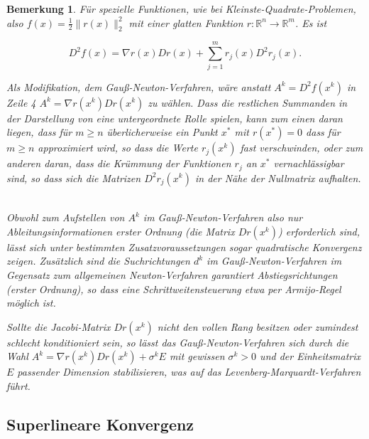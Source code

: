 \documentclass[11pt]{scrreprt}
\theoremstyle{thmstyle}
\numberwithin{thm}{section}
\newtheorem*{bemerkung*}{Bemerkung}
\begin{document}
\begin{bemerkung*}
	Für spezielle Funktionen, wie bei Kleinste-Quadrate-Problemen, also $f(x) = \frac{1}{2} \| r(x) \|_2^2$ mit einer glatten Funktion $r \colon \mathbb{R}^n \rightarrow \mathbb{R}^m$. Es ist
	
	$$ D^2 f(x) = \nabla r(x) D r(x) + \sum_{j=1}^m r_j(x) D^2 r_j(x). $$
	
	Als Modifikation, dem Gauß-Newton-Verfahren, wäre anstatt $A^k = D^2 f (x^k)$ in Zeile 4 $A^k = \nabla r(x^k) Dr(x^k)$ zu wählen. Dass die restlichen Summanden in der Darstellung von eine untergeordnete Rolle spielen, kann zum einen daran liegen, dass für $m \geq n$ überlicherweise ein Punkt $x^*$ mit $r(x^*) = 0$ dass für $m \geq n$ approximiert wird, so dass die Werte $r_j (x^k)$ fast verschwinden, oder zum anderen daran, dass die Krümmung der Funktionen $r_j$ an $x^*$ vernachlässigbar sind, so dass sich die Matrizen $D^2 r_j (x^k)$ in der Nähe der Nullmatrix aufhalten. ~\bigskip
	
	Obwohl zum Aufstellen von $A^k$ im Gauß-Newton-Verfahren also nur Ableitungsinformationen erster Ordnung (die Matrix $Dr(x^k)$) erforderlich sind, lässt sich unter bestimmten Zusatzvoraussetzungen sogar quadratische Konvergenz zeigen. Zusätzlich sind die Suchrichtungen $d^k$ im Gauß-Newton-Verfahren im Gegensatz zum allgemeinen Newton-Verfahren garantiert Abstiegsrichtungen (erster Ordnung), so dass eine Schrittweitensteuerung etwa per Armijo-Regel möglich ist. ~\bigskip
	
	Sollte die Jacobi-Matrix $D r(x^k)$ nicht den vollen Rang besitzen oder zumindest schlecht konditioniert sein, so lässt das Gauß-Newton-Verfahren sich durch die Wahl $A^k = \nabla r(x^k) Dr(x^k) + \sigma^k E$ mit gewissen $\sigma^k > 0$ und der Einheitsmatrix $E$ passender Dimension stabilisieren, was auf das Levenberg-Marquardt-Verfahren führt.
\end{bemerkung*}

\subsection*{Superlineare Konvergenz}
\end{document}
